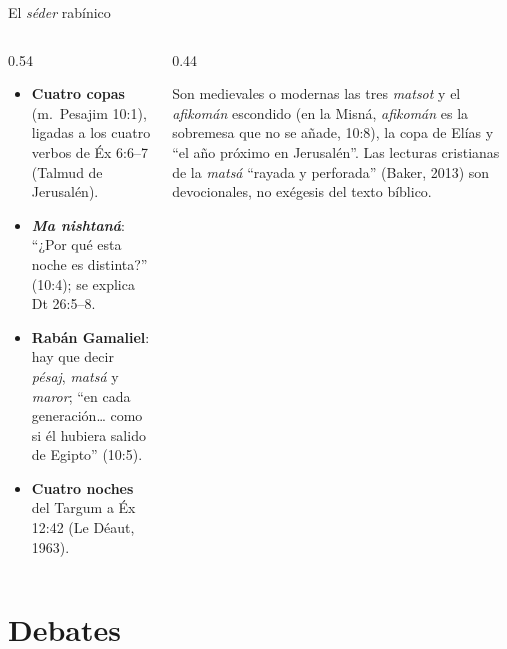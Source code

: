 \documentclass[hyperref={bookmarks=false},aspectratio=169]{beamer}
\begin{document}
\begin{frame}{El \emph{séder} rabínico}
\begin{columns}[t,onlytextwidth]
\begin{column}{0.54\textwidth}\small
\begin{itemize}
\item \textbf{Cuatro copas} (m.~Pesajim 10:1), ligadas a los cuatro verbos de Éx 6:6--7 (Talmud de Jerusalén).
\item \textbf{\emph{Ma nishtaná}}: ``¿Por qué esta noche es distinta?'' (10:4); se explica Dt 26:5--8.
\item \textbf{Rabán Gamaliel}: hay que decir \emph{pésaj}, \emph{matsá} y \emph{maror}; ``en cada generación\ldots{} como si él hubiera salido de Egipto'' (10:5).
\item \textbf{Cuatro noches} del Targum a Éx 12:42 (Le Déaut, 1963).
\end{itemize}
\end{column}
\begin{column}{0.44\textwidth}
\begin{tcolorbox}[colback=mostaza!10,colframe=mostaza!85!tierraroja,boxrule=0.6pt,arc=2pt,title={Precisión: lo tardío},fonttitle=\bfseries\scriptsize,coltitle=caferojizo,colbacktitle=mostaza!30,fontupper=\scriptsize]
Son medievales o modernas las tres \emph{matsot} y el \emph{afikomán} escondido (en la Misná, \emph{afikomán} es la sobremesa que no se añade, 10:8), la copa de Elías y ``el año próximo en Jerusalén''. Las lecturas cristianas de la \emph{matsá} ``rayada y perforada'' (Baker, 2013) son devocionales, no exégesis del texto bíblico.
\end{tcolorbox}
\end{column}
\end{columns}
\end{frame}

\section{Debates}
\end{document}
